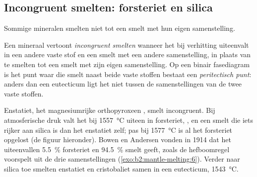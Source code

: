 \subsection*{Incongruent smelten: forsteriet en silica}

Sommige mineralen smelten niet tot een smelt met hun eigen samenstelling.

\begin{definition}\label{def:b2:mantle-melting:peritectic}
Een mineraal vertoont \emph{incongruent smelten} wanneer het bij
verhitting uiteenvalt in een andere vaste stof en een smelt met een andere
samenstelling, in plaats van te smelten tot een smelt met zijn eigen samenstelling. Op een binair
fasediagram is het punt waar die smelt naast beide vaste stoffen bestaat een
\emph{peritectisch punt}: anders dan een eutecticum ligt het niet
tussen de samenstellingen van de twee vaste stoffen.
\end{definition}

Enstatiet, het magnesiumrijke orthopyroxeen , smelt incongruent. Bij
atmosferische druk valt het bij \qty{1557}{\celsius} uiteen in forsteriet,
, en een smelt die iets rijker aan silica is dan het enstatiet zelf; pas bij
\qty{1577}{\celsius} is al het forsteriet opgelost (de figuur hieronder). Bowen
en Andersen vonden in 1914 dat het uiteenvallen \qty{5.5}{\percent}
forsteriet en \qty{94.5}{\percent} smelt geeft, zoals de hefboomregel voorspelt uit
de drie samenstellingen (\cref{exo:b2:mantle-melting:6}). Verder naar silica toe smelten enstatiet en
cristobaliet samen in een eutecticum, \qty{1543}{\celsius}.

